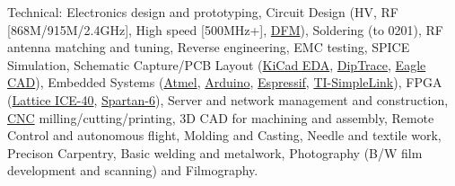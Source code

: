\inlineheadsection  %
  {Technical:}
  {Electronics design and prototyping,
   Circuit Design (HV, RF [868M/915M/2.4GHz], High speed [500MHz+], \href{https://en.wikipedia.org/wiki/Design_for_manufacturability}{DFM}),
   Soldering (to 0201),
   RF antenna matching and tuning,
   Reverse engineering,
   EMC testing,
   SPICE Simulation,
   Schematic Capture/PCB Layout
   (\href{http://kicad-pcb.org/}{KiCad EDA},
   \href{http://diptrace.com/}{DipTrace},
   \href{http://www.cadsoftusa.com/}{Eagle CAD}),
   Embedded Systems
    (\href{http://www.atmel.com/}{Atmel},
    \href{http://www.arduino.cc/}{Arduino},
    \href{https://espressif.com/}{Espressif},
    \href{http://www.ti.com/wireless-connectivity/simplelink-solutions/overview/overview.html}{TI-SimpleLink}),
   FPGA
    (\href{http://www.latticesemi.com/iCE40}{Lattice ICE-40},
    \href{http://www.xilinx.com/products/silicon-devices/fpga/spartan-6.html}{Spartan-6}),
   Server and network management and construction,
   \href{http://en.wikipedia.org/wiki/Numerical_control}{CNC} milling/cutting/printing,
   3D CAD for machining and assembly,
   Remote Control and autonomous flight,
   Molding and Casting,
   Needle and textile work, 
   Precison Carpentry, 
   Basic welding and metalwork,
   Photography (B/W film development and scanning) and Filmography.
  }
  \vspace{0.3em}
